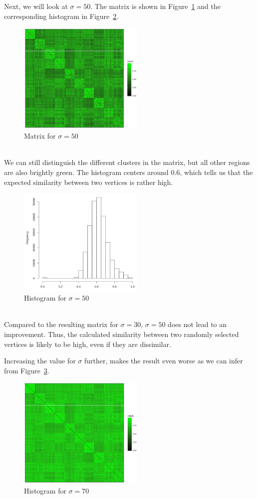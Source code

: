 \documentclass{support/acm_proc_article-sp}
\begin{document}
    Next, we will look at $\sigma = 50$.
    The matrix is shown in Figure~\ref{fig:2a-s50} and the corresponding histogram in Figure~\ref{fig:2a-s50-h}.
    \begin{figure}[htbp]
        \centering
        \includegraphics[width=6cm]{images/2a-s50.png}
        \caption{Matrix for $\sigma = 50$}
        \label{fig:2a-s50}
    \end{figure} \\
    We can still distinguish the different clusters in the matrix, but all other regions are also brightly green.
    The histogram centers around $0.6$, which tells us that the expected similarity between two vertices is rather high.
    \begin{figure}[htbp]
        \centering
        \includegraphics[width=6cm]{images/2a-s50-h.png}
        \caption{Histogram for $\sigma = 50$}
        \label{fig:2a-s50-h}
    \end{figure} \\
    Compared to the resulting matrix for $\sigma = 30$, $\sigma = 50$ does not lead to an improvement.
    Thus, the calculated similarity between two randomly selected vertices is likely to be high, even if they are dissimilar.

    Increasing the value for $\sigma$ further, makes the result even worse as we can infer from Figure~\ref{fig:2a-s70}.
    \begin{figure}[htbp]
        \centering
        \includegraphics[width=6cm]{images/2a-s70.png}
        \caption{Histogram for $\sigma = 70$}
        \label{fig:2a-s70}
    \end{figure} \\
\end{document}
